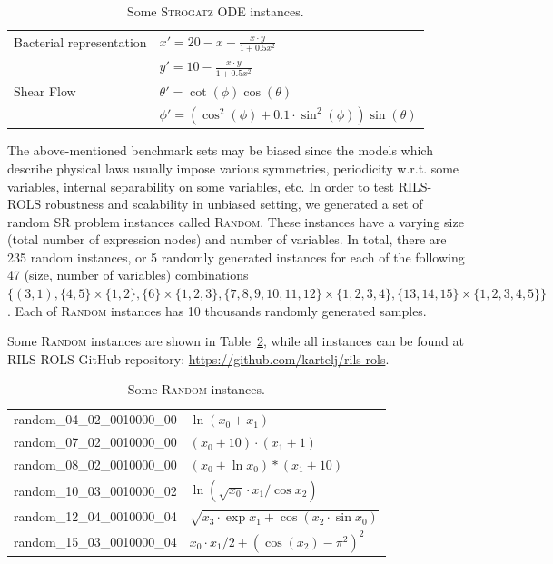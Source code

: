 \documentclass{bmcart}
\begin{document}
\begin{itemize}
	\begin{table}
		\centering
		\begin{tabular}{ll} \\ \hline
			Bacterial representation &   $x' = 20 - x - \frac{x \cdot y}{1 + 0.5 x^2 }$ \\ 
			&   $y' = 10 - \frac{x \cdot y}{1 + 0.5 x^2  }$ \\ \hline
			Shear Flow               &  $\theta' = \cot(\phi)\cos(\theta)$ \\
			&  $ \phi'  = ( \cos^2(\phi) + 0.1 \cdot \sin^2 (\phi)) \sin(\theta) $ \\ \hline
		\end{tabular}
		\caption{Some \textsc{Strogatz} ODE instances.}
		\label{table:strogatz-ODEs}
	\end{table}
	
\end{itemize}

The above-mentioned benchmark sets may be biased since the models which describe physical laws usually impose   various symmetries, periodicity w.r.t. some variables, internal separability on some variables, etc. In order to test \textsc{RILS-ROLS} robustness and scalability in unbiased setting, we generated a set of random SR problem instances called \textsc{Random}. These instances have a varying size (total number of expression nodes) and number of variables. In total, there are 235 random instances, or 5 randomly generated instances for each of the following 47 (size, number of variables) combinations $\{(3, 1), \{4, 5\} \times \{1, 2\}, \{6\} \times \{1, 2, 3\}, \{7, 8, 9, 10, 11, 12\} \times \{1, 2, 3, 4\}, \{13, 14, 15\} \times \{1, 2, 3, 4, 5\}\}$. Each of \textsc{Random} instances has 10 thousands randomly generated samples. 

Some \textsc{Random} instances are shown in Table~\ref{table:random}, while all instances can be found at \textsc{RILS-ROLS} GitHub repository: \url{https://github.com/kartelj/rils-rols}. 

\begin{table}
	\centering
	\begin{tabular}{ll} \\ \hline
		random\_04\_02\_0010000\_00 &	$\ln{(x_0 + x_1)}$\\
		random\_07\_02\_0010000\_00 &	$(x_0 + 10)\cdot (x_1 + 1)$\\
		random\_08\_02\_0010000\_00 &	$(x_0 + \ln{x_0})*(x_1 + 10)$\\
		random\_10\_03\_0010000\_02 &	$\ln{(\sqrt{x_0} \cdot x_1/\cos{x_2})}$\\
		random\_12\_04\_0010000\_04 &	$\sqrt{x_3 \cdot \exp{x_1} + \cos{(x_2 \cdot \sin{x_0})}}$\\
		random\_15\_03\_0010000\_04	&   $x_0 \cdot x_1/2 + (\cos{(x_2)} - \pi^2)^2$\\
		\hline
	\end{tabular}
	\caption{Some \textsc{Random} instances.}
	\label{table:random}
\end{table}
\end{document}

